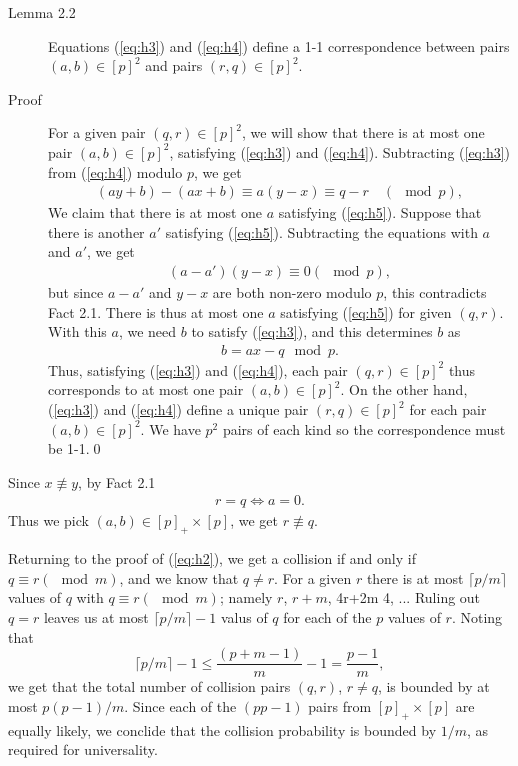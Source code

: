 \begin{description}
\item[Lemma 2.2] Equations (\ref{eq:h3}) and (\ref{eq:h4}) define a 1-1
  correspondence between pairs $(a,b)\in [p]^2$ and pairs $(r,q)\in[p]^2$.
\item[Proof] For a given pair $(q,r) \in [p]^2$, we will show that there is at
  most one pair $(a,b) \in [p]^2$, satisfying (\ref{eq:h3}) and (\ref{eq:h4}).
  Subtracting (\ref{eq:h3}) from (\ref{eq:h4}) modulo $p$, we get
  \begin{align}
    (ay+b) - (ax+b) \equiv a(y-x) \equiv q-r \quad (\mod p), \label{eq:h5}
  \end{align}
  We claim that there is at most one $a$ satisfying (\ref{eq:h5}). Suppose that
  there is another $a'$ satisfying (\ref{eq:h5}).  Subtracting the equations
  with $a$ and $a'$, we get
  \begin{align*}
    (a-a')(y-x) \equiv 0 (\mod p),
  \end{align*}
  but since $a-a'$ and $y-x$ are both non-zero modulo $p$, this contradicts Fact
  2.1. There is thus at most one $a$ satisfying (\ref{eq:h5}) for given
  $(q,r)$. With this $a$, we need $b$ to satisfy (\ref{eq:h3}), and this
  determines $b$ as
  \begin{align}
    b = ax-q\mod p. \label{eq:h6}
  \end{align}
  Thus, satisfying (\ref{eq:h3}) and (\ref{eq:h4}), each pair $(q,r)\in [p]^2$
  thus corresponds to at most one pair $(a,b)\in [p]^2$. On the other hand,
  (\ref{eq:h3}) and (\ref{eq:h4}) define a unique pair $(r,q)\in[p]^2$ for each
  pair $(a,b)\in [p]^2$. We have $p^2$ pairs of each kind so the correspondence
  must be 1-1.\qed
\end{description}

Since $x \not\equiv y$, by Fact 2.1
\begin{align}
  r = q \Longleftrightarrow a = 0. \label{eq:h7}
\end{align}
Thus we pick $(a,b) \in [p]_+ \times [p]$, we get $r \not\equiv q$.

Returning to the proof of (\ref{eq:h2}), we get a collision if and only if $q
\equiv r (\mod m)$, and we know that $q \neq r$. For a given $r$ there is at
most $\lceil p/m\rceil$ values of $q$ with $q \equiv r (\mod m)$; namely $r$,
$r+m$, 4r+2m 4, ... Ruling out $q = r$ leaves us at most $\lceil p/m \rceil - 1$
valus of $q$ for each of the $p$ values of $r$. Noting that
\[
  \lceil p/m\rceil - 1 \leq  \frac{(p+m-1)}{m}-1 = \frac{p-1}{m},
\]
we get that the total number of collision pairs $(q,r)$, $r \neq q$, is bounded
by at most $p(p-1)/m$. Since each of the $(pp-1)$ pairs from $[p]_+ \times [p]$
are equally likely, we conclide that the collision probability is bounded by
$1/m$, as required for universality.


